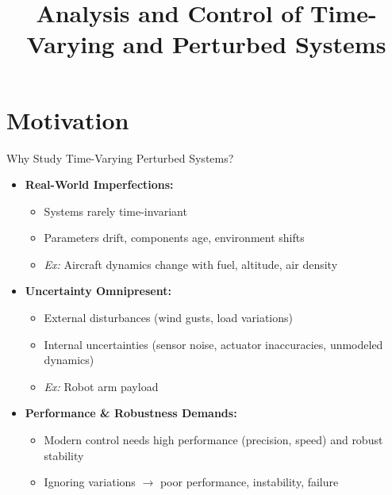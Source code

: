 \documentclass[student, noshadow, lsr, english, aspectratio=169, t]{ITR_LSR_slides}
\title{Analysis and Control of Time-Varying and Perturbed Systems}
\begin{document}
\begin{frame}
    \titlepage
\end{frame}


\section{Motivation}

\begin{frame}{Why Study Time-Varying Perturbed Systems?}
	\begin{itemize}
		\item \textbf{Real-World Imperfections:}
		\begin{itemize}
			\item Systems rarely time-invariant
			\item Parameters drift, components age, environment shifts
			\item \textit{Ex:} Aircraft dynamics change with fuel, altitude, air density
		\end{itemize}
		\item \textbf{Uncertainty Omnipresent:}
		\begin{itemize}
			\item External disturbances (wind gusts, load variations)
			\item Internal uncertainties (sensor noise, actuator inaccuracies, unmodeled dynamics)
			\item \textit{Ex:} Robot arm payload
		\end{itemize}
		\item \textbf{Performance \& Robustness Demands:}
		\begin{itemize}
			\item Modern control needs high performance (precision, speed) and robust stability
			\item Ignoring variations $\rightarrow$ poor performance, instability, failure
		\end{itemize}
	\end{itemize}
\end{frame}
\end{document}
